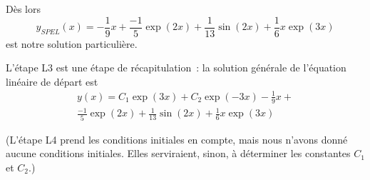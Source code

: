 \begin{frame}
Dès lors
  \begin{equation*}
    y_{SPEL}(x) = -\frac19 x + \frac{-1}{5} \exp(2x) + \frac{1}{13} \sin(2x) + \frac{1}{6} x \exp(3x)
  \end{equation*}
  est notre solution particulière.\pause{}



  L'étape L3 est une étape de récapitulation~: la solution générale de l'équation linéaire de départ est\pause{}
  \begin{multline*}
    y(x) = C_{1}\exp(3x) + C_{2}\exp(-3x) - \frac19 x +\\ \frac{-1}{5} \exp(2x) + \frac{1}{13} \sin(2x) + \frac{1}{6} x \exp(3x)
  \end{multline*}\pause{}

  (L'étape L4 prend les conditions initiales en compte, mais nous n'avons donné aucune conditions initiales.\pause{} Elles serviraient, sinon, à déterminer les constantes \(C_{1}\) et \(C_{2}\).)
\end{frame}





